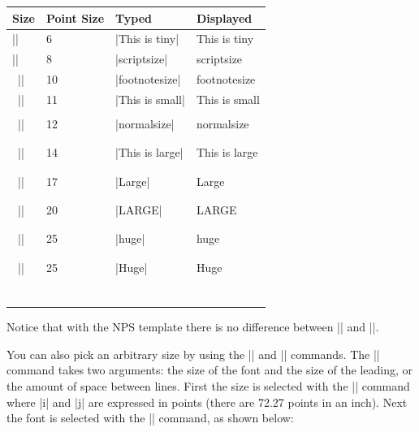 \begin{center}
\begin{tabular}{llll}
Size          & Point Size & Typed & Displayed  \\\hline
|\tiny|       &  6 & |{\tiny This is tiny}| & {\tiny This is tiny}\\
|\scriptsize| &  8 & |{\scriptsize scriptsize}| & {\scriptsize scriptsize} \\\
|\footnotesize| & 10 & |{\footnotesize footnotesize}| & {\footnotesize footnotesize} \\\
|\small|        & 11 & |{\small This is small}| & {\small This is small} \\\\\
|\normalsize|   & 12 & |{\normalsize normalsize}| & {\normalsize  normalsize} \\\\\\\
|\large|        & 14 & |{\large This is large}| & {\large This is large} \\\\\\\
|\Large|        & 17 & |{\Large Large}| & {\Large Large} \\\\\\\
|\LARGE|        & 20 & |{\LARGE LARGE}| & {\LARGE LARGE} \\\\\\\
|\huge|         & 25 & |{\huge huge}| & {\huge huge} \\\\\\\
|\Huge|         & 25 & |{\Huge Huge}| & {\Huge Huge} \\\\\\\
\end{tabular}
\end{center}

Notice that with the NPS template there is no difference between
|\huge| and |\Huge|.

You can also pick an arbitrary size by using the |\fontsize| and
|\selectfont| commands. The |\fontsize| command takes two arguments:
the size of the font and the size of the leading, or the amount of
space between lines. First the size is selected with the
|\fontsize{i}{j}| command where |i| and |j| are expressed in points
(there are 72.27 points in an inch). Next the font is selected with the |\selectfont| command, as shown below:

